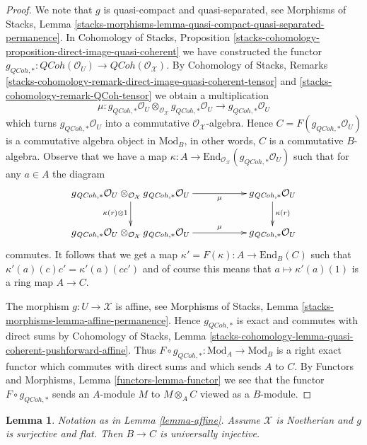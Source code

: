 \documentclass{stacks-project}
\theoremstyle{plain}
\newtheorem{lemma}[subsection]{Lemma}
\theoremstyle{definition}
\theoremstyle{remark}
\numberwithin{equation}{subsection}
\def\QCoh{\mathit{QCoh}}
\begin{document}
\begin{proof}
We note that $g$ is quasi-compact and quasi-separated, see
Morphisms of Stacks, Lemma
\ref{stacks-morphisms-lemma-quasi-compact-quasi-separated-permanence}.
In Cohomology of Stacks, Proposition
\ref{stacks-cohomology-proposition-direct-image-quasi-coherent}
we have constructed the functor
$g_{\QCoh, *} : \QCoh(\mathcal{O}_U) \to \QCoh(\mathcal{O}_\mathcal{X})$.
By Cohomology of Stacks, Remarks
\ref{stacks-cohomology-remark-direct-image-quasi-coherent-tensor} and
\ref{stacks-cohomology-remark-QCoh-tensor}
we obtain a multiplication
$$
\mu :
g_{\QCoh, *}\mathcal{O}_U
\otimes_{\mathcal{O}_\mathcal{X}}
g_{\QCoh, *}\mathcal{O}_U
\longrightarrow
g_{\QCoh, *}\mathcal{O}_U
$$
which turns $g_{\QCoh, *}\mathcal{O}_U$ into a commutative
$\mathcal{O}_\mathcal{X}$-algebra. Hence $C = F(g_{\QCoh, *}\mathcal{O}_U)$
is a commutative algebra object in $\text{Mod}_B$, in other words, $C$ is a
commutative $B$-algebra. Observe that we have a map
$\kappa : A \to \text{End}_{\mathcal{O}_\mathcal{X}}(g_{\QCoh, *}\mathcal{O}_U)$
such that for any $a \in A$ the diagram
$$
\xymatrix{
g_{\QCoh, *}\mathcal{O}_U \otimes_{\mathcal{O}_\mathcal{X}}
g_{\QCoh, *}\mathcal{O}_U
\ar[d]_{\kappa(r) \otimes 1} \ar[rr]_-\mu & &
g_{\QCoh, *}\mathcal{O}_U \ar[d]^{\kappa(r)} \\
g_{\QCoh, *}\mathcal{O}_U \otimes_{\mathcal{O}_\mathcal{X}}
g_{\QCoh, *}\mathcal{O}_U
\ar[rr]^-\mu & &
g_{\QCoh, *}\mathcal{O}_U
}
$$
commutes. It follows that we get a map
$\kappa' = F(\kappa) : A \to \text{End}_B(C)$
such that $\kappa'(a)(c) c' = \kappa'(a)(cc')$ and of course this means that
$a \mapsto \kappa'(a)(1)$ is a ring map $A \to C$.

\medskip\noindent
The morphism $g : U \to \mathcal{X}$ is affine, see
Morphisms of Stacks, Lemma \ref{stacks-morphisms-lemma-affine-permanence}.
Hence $g_{\QCoh, *}$ is exact and commutes with direct sums by
Cohomology of Stacks, Lemma
\ref{stacks-cohomology-lemma-quasi-coherent-pushforward-affine}.
Thus $F \circ g_{\QCoh, *} : \text{Mod}_A \to \text{Mod}_B$
is a right exact functor which commutes with direct sums
and which sends $A$ to $C$.
By Functors and Morphisms, Lemma \ref{functors-lemma-functor}
we see that the functor $F \circ g_{\QCoh, *}$ sends an $A$-module
$M$ to $M \otimes_A C$ viewed as a $B$-module.
\end{proof}

\begin{lemma}
\label{lemma-universally-injective}
Notation as in Lemma \ref{lemma-affine}. Assume $\mathcal{X}$ is
Noetherian and $g$ is surjective and flat.
Then $B \to C$ is universally injective.
\end{lemma}
\end{document}
